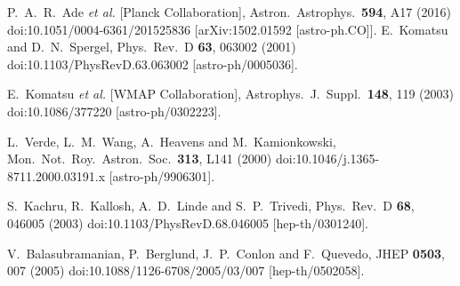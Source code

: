 \documentclass[a4paper,11pt]{article}
\begin{document}
\begin{thebibliography}{99}
%


  P.~A.~R.~Ade {\it et al.} [Planck Collaboration],
  Astron.\ Astrophys.\  {\bf 594}, A17 (2016)
  doi:10.1051/0004-6361/201525836
  [arXiv:1502.01592 [astro-ph.CO]].
%
  E.~Komatsu and D.~N.~Spergel,
  Phys.\ Rev.\ D {\bf 63}, 063002 (2001)
  doi:10.1103/PhysRevD.63.063002
  [astro-ph/0005036].


  E.~Komatsu {\it et al.} [WMAP Collaboration],
  Astrophys.\ J.\ Suppl.\  {\bf 148}, 119 (2003)
  doi:10.1086/377220
  [astro-ph/0302223].


  L.~Verde, L.~M.~Wang, A.~Heavens and M.~Kamionkowski,
  Mon.\ Not.\ Roy.\ Astron.\ Soc.\  {\bf 313}, L141 (2000)
  doi:10.1046/j.1365-8711.2000.03191.x
  [astro-ph/9906301].


  S.~Kachru, R.~Kallosh, A.~D.~Linde and S.~P.~Trivedi,
  Phys.\ Rev.\ D {\bf 68}, 046005 (2003)
  doi:10.1103/PhysRevD.68.046005
  [hep-th/0301240].


  V.~Balasubramanian, P.~Berglund, J.~P.~Conlon and F.~Quevedo,
  JHEP {\bf 0503}, 007 (2005)
  doi:10.1088/1126-6708/2005/03/007
  [hep-th/0502058].


\end{thebibliography}
\end{document}
